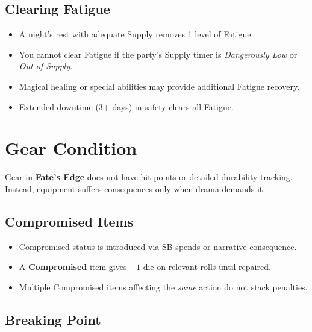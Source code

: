 \subsection{Clearing Fatigue}\label{subsec:clearing_fatigue}

\begin{itemize}
    \item A night's rest with adequate Supply removes 1 level of Fatigue.
    \item You cannot clear Fatigue if the party's Supply timer is \emph{Dangerously Low} or \emph{Out of Supply}.
    \item Magical healing or special abilities may provide additional Fatigue recovery.
    \item Extended downtime (3+ days) in safety clears all Fatigue.
\end{itemize}

\section{Gear Condition}\label{sec:gear_condition}

Gear in \textbf{Fate's Edge} does not have hit points or detailed durability tracking. Instead, equipment suffers consequences only when drama demands it.

\subsection{Compromised Items}\label{subsec:compromised_gear}

\begin{itemize}
    \item Compromised status is introduced via SB spends or narrative consequence.
    \item A \textbf{Compromised} item gives \(-1\) die on relevant rolls until repaired.
    \item Multiple Compromised items affecting the \emph{same} action do not stack penalties.
\end{itemize}

\subsection{Breaking Point}\label{subsec:gear_breaking}

